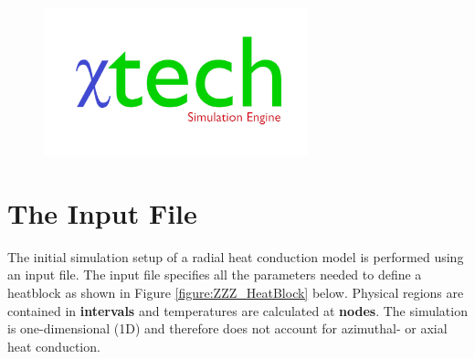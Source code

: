\documentclass[11pt,letterpaper,titlepage]{article}
\begin{document}
\begin{titlepage}
\begin{center}
\begin{minipage}[c]{0.45\textwidth}
\begin{figure}[H]
				\includegraphics[width=3in]{Logo2_Medium.png}
			\end{figure}
		\end{minipage}
	\end{center}
	\vspace{2cm}
\end{titlepage}


\pagestyle{fancy}
\cfoot{}
\lfoot{\truncate{14cm}{\NSCDOCTITLE}}
\rhead{}
\chead{\currentname}
\lhead{}
\renewcommand{\footrulewidth}{0.4pt}
\tableofcontents
{}

\listoffigures
{}


\newpage
{}
\section{The Input File}
The initial simulation setup of a radial heat conduction model is performed using an input file. The input file specifies all the parameters needed to define a heatblock as shown in Figure \ref{figure:ZZZ_HeatBlock} below. Physical regions are contained in \textbf{intervals} and temperatures are calculated at \textbf{nodes}. The simulation is one-dimensional (1D) and therefore does not account for azimuthal- or axial heat conduction.
\end{document}
